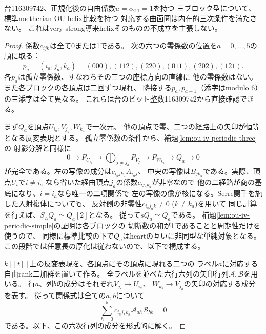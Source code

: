 \begin{theorem}[116309742の特殊値の六周期対象による排除]
\label{thm:ou-seven-zero-six-cycle-exclusion}
台116309742、正規化後の自由係数$u=c_{211}=1$を持つ
三ブロック型について、標準noetherian OU helix比較を持つ
対応する曲面圏は内在的三次条件を満たさない。
これはvery strong導来helixそのものの不成立を主張しない。
\end{theorem}
\begin{proof}
係数$c_{ijk}$は全て0または1である。
次の六つの零係数の位置を$a=0,\ldots,5$の順に取る：
\[
 p_a=(i_a,j_a,k_a)=(000),(112),(220),(011),(202),(121).
\]
各$p_a$は孤立零係数、すなわちその三つの座標方向の直線に
他の零係数はない。また各ブロックの各頂点は二回ずつ現れ、
隣接する$p_a,p_{a+1}$（添字はmodulo 6）の三添字は全て異なる。
これらは台のビット整数116309742から直接確認できる。

まず$Q_a$を頂点$U_{i_a},V_{j_a},W_{k_a}$で一次元、
他の頂点で零、二つの経路上の矢印が恒等となる反変表現とする。
孤立零係数の条件から、補題\ref{lem:ou-iv-periodic-three}の
射影分解と同様に
\[
 0\longrightarrow P_{U_{i_a}}\longrightarrow
 \bigoplus_{j\ne j_a}P_{V_j}\longrightarrow P_{W_{k_a}}
 \longrightarrow Q_a\longrightarrow0
\]
が完全である。左の写像の成分は$c_{i_a j k_a}A_{i_a j}$、
中央の写像は$B_{j k_a}$である。実際、頂点$U_i$で$i\ne i_a$
なら省いた経由頂点$j_a$の係数$c_{i j_a k_a}$が非零なので
他の二経路が商の基底になり、$i=i_a$なら唯一の二項関係で
左の写像の像が核になる。Serre関手を施した入射複体についても、
反対側の非零性$c_{i_a j_a k}\ne0$ ($k\ne k_a$)を用いて
同じ計算を行えば、$S_\Lambda Q_a\simeq Q_a[2]$となる。
従って$sQ_a\simeq Q_a$である。
補題\ref{lem:ou-iv-periodic-simple}の証明は各ブロックの
切断数の和が1であることと周期性だけを使うので、
同様に標準比較の下で$Q_a$はheartの互いに非同型な単純対象となる。
この段階では任意長の厚化は従わないので、以下で構成する。

$k[[t]]$上の反変表現を、各頂点にその頂点に現れる二つの
ラベル$a$に対応する自由rank二加群を置いて作る。
全ラベルを並べた六行六列の矢印行列$\mathcal A,\mathcal B$を用いる。
行$a$、列$b$の成分はそれぞれ$V_{j_b}\to U_{i_a}$、
$W_{k_b}\to V_{j_a}$の矢印の対応する成分を表す。
従って関係式は全ての$a,b$について
\[
 \sum_{h=0}^5 c_{i_a j_h k_b}\mathcal A_{ah}\mathcal B_{hb}=0
\]
である。以下、この六次行列の成分を形式的に解く。


\end{proof}
